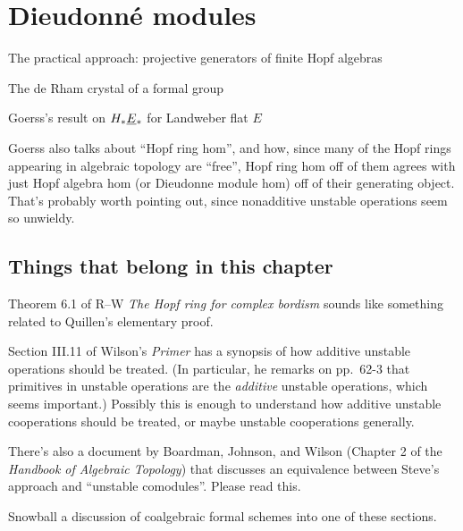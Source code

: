 \section{Dieudonn\'e modules}

The practical approach: projective generators of finite Hopf algebras

The de Rham crystal of a formal group

Goerss's result on $H_* \smash{\underline{E}}_{*}$ for Landweber flat $E$



Goerss also talks about ``Hopf ring hom'', and how, since many of the Hopf rings appearing in algebraic topology are ``free'', Hopf ring hom off of them agrees with just Hopf algebra hom (or Dieudonne module hom) off of their generating object.  That's probably worth pointing out, since nonadditive unstable operations seem so unwieldy.







\subsection*{Things that belong in this chapter}

Theorem 6.1 of R--W \textit{The Hopf ring for complex bordism} sounds like something related to Quillen's elementary proof.

Section III.11 of Wilson's \textit{Primer} has a synopsis of how additive unstable operations should be treated.  (In particular, he remarks on pp.\ 62-3 that primitives in unstable operations are the \emph{additive} unstable operations, which seems important.)  Possibly this is enough to understand how additive unstable cooperations should be treated, or maybe unstable cooperations generally.

There's also a document by Boardman, Johnson, and Wilson (Chapter 2 of the \textit{Handbook of Algebraic Topology}) that discusses an equivalence between Steve's approach and ``unstable comodules''.  Please read this.

Snowball a discussion of coalgebraic formal schemes into one of these sections.





